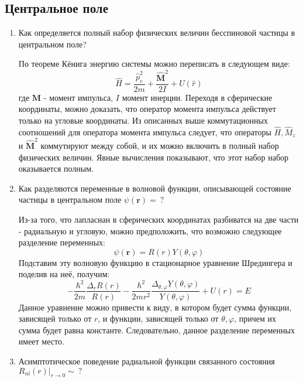 \documentclass{article}
\begin{document}
\subsection*{Центральное поле}
	\begin{enumerate}
		\item {Как определяется полный набор физических величин бесспиновой частицы в центральном поле?}
		
		По теореме Кёнига энергию системы можно переписать в следующем виде:
		\begin{equation}
			\hat{H} = \frac{\hat{p}_r^2}{2m} + \frac{\hat{\textbf{M}}^2}{2I} + U(\hat{r})
		\end{equation}
		где $\textbf{M}$ - момент импульса, $I$ момент инерции. Переходя в сферические координаты, можно доказать, что оператор момента импульса действует только на угловые координаты. Из описанных выше коммутационных соотношений для оператора момента импульса следует, что операторы $\hat{H}, \hat{M}_z$ и $\hat{\textbf{M}}^2$ коммутируют между собой, и их можно включить в полный набор физических величин. Явные вычисления показывают, что этот набор набор оказывается полным.
		 
		 \item {Как разделяются переменные в волновой функции, описывающей состояние частицы в центральном поле $\psi(\textbf{r}) = \ ?$}
		 
		 Из-за того, что лапласиан в сферических координатах разбиватся на две части - радиальную и угловую, можно предположить, что возможно следующее разделение переменных:
		 \begin{equation}
		 	\psi(\textbf{r}) = R(r)Y(\theta,\varphi)
		 \end{equation}
		 Подставим эту волновую функцию в стационарное уравнение Шредингера и поделив на неё, получим:
		 \begin{equation}
		 	-\frac{\hbar^2}{2m} \frac{\Delta_r R(r)}{R(r)} - \frac{\hbar^2}{2mr^2}\frac{\Delta_{\theta,\varphi} Y(\theta, \varphi)}{Y(\theta, \varphi)} + U(r) = E
		 \end{equation}
		 Данное уравнение можно привести к виду, в котором будет сумма функции, зависящей только от $r$, и функции, зависящей только от $\theta,\varphi$, причем их сумма будет равна константе. Следовательно, данное разделение переменных имеет место.
		 
		 \item {Асимптотическое поведение радиальной функции связанного состояния $\left.R_{nl}(r)\right|_{r \to 0} \sim \ ?$}
		 

\end{enumerate}
\end{document}
